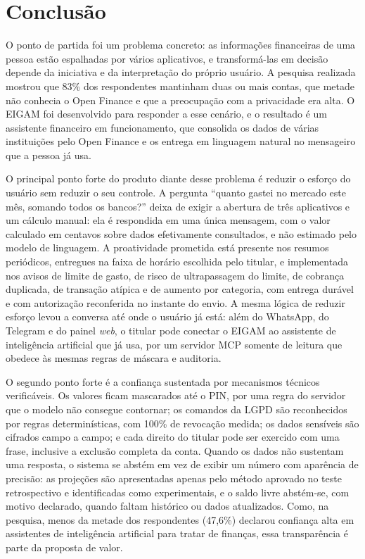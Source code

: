 \chapter{Conclusão}

O ponto de partida foi um problema concreto: as informações financeiras de uma pessoa estão espalhadas por vários aplicativos, e transformá-las em decisão depende da iniciativa e da interpretação do próprio usuário. A pesquisa realizada mostrou que 83\% dos respondentes mantinham duas ou mais contas, que metade não conhecia o Open Finance e que a preocupação com a privacidade era alta. O EIGAM foi desenvolvido para responder a esse cenário, e o resultado é um assistente financeiro em funcionamento, que consolida os dados de várias instituições pelo Open Finance e os entrega em linguagem natural no mensageiro que a pessoa já usa.

O principal ponto forte do produto diante desse problema é reduzir o esforço do usuário sem reduzir o seu controle. A pergunta ``quanto gastei no mercado este mês, somando todos os bancos?'' deixa de exigir a abertura de três aplicativos e um cálculo manual: ela é respondida em uma única mensagem, com o valor calculado em centavos sobre dados efetivamente consultados, e não estimado pelo modelo de linguagem. A proatividade prometida está presente nos resumos periódicos, entregues na faixa de horário escolhida pelo titular, e implementada nos avisos de limite de gasto, de risco de ultrapassagem do limite, de cobrança duplicada, de transação atípica e de aumento por categoria, com entrega durável e com autorização reconferida no instante do envio. A mesma lógica de reduzir esforço levou a conversa até onde o usuário já está: além do WhatsApp, do Telegram e do painel \textit{web}, o titular pode conectar o EIGAM ao assistente de inteligência artificial que já usa, por um servidor MCP somente de leitura que obedece às mesmas regras de máscara e auditoria.

O segundo ponto forte é a confiança sustentada por mecanismos técnicos verificáveis. Os valores ficam mascarados até o PIN, por uma regra do servidor que o modelo não consegue contornar; os comandos da LGPD são reconhecidos por regras determinísticas, com 100\% de revocação medida; os dados sensíveis são cifrados campo a campo; e cada direito do titular pode ser exercido com uma frase, inclusive a exclusão completa da conta. Quando os dados não sustentam uma resposta, o sistema se abstém em vez de exibir um número com aparência de precisão: as projeções são apresentadas apenas pelo método aprovado no teste retrospectivo e identificadas como experimentais, e o saldo livre abstém-se, com motivo declarado, quando faltam histórico ou dados atualizados. Como, na pesquisa, menos da metade dos respondentes (47,6\%) declarou confiança alta em assistentes de inteligência artificial para tratar de finanças, essa transparência é parte da proposta de valor.

